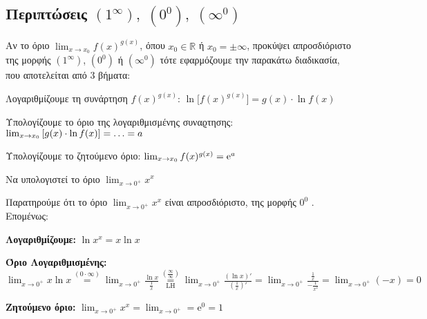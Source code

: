 \subsection*{Περιπτώσεις $ (1^{\infty}), \; (0^{0}), \; (\infty^{0}) $}


Αν το όριο $ \lim_{x \to x_{0}} f(x)^{g(x)} $, όπου $ x_{0} \in
\mathbb{R} $ ή $ x_{0}= \pm \infty $, προκύψει απροσδιόριστο της μορφής 
$ (1^{\infty}) $, $ (0^0) $ ή $ (\infty^{0}) $ 
τότε εφαρμόζουμε την παρακάτω διαδικασία, που αποτελείται από 3 βήματα:
\begin{myitemize}
  \item \textcolor{Col1}{Λογαριθμίζουμε τη συνάρτηση $ f(x)^{g(x)} $:} $ \ln{\bigl[f(x)^{g(x)}\bigr]} = g(x)\cdot \ln{f(x)} $
  \item \textcolor{Col1}{Υπολογίζουμε το όριο της λογαριθμισμένης συναϱτησης:} 
    $ \lim_{\smash{x \to x_{0}}} \left[g(x)\cdot \ln{f(x)}\right] = \ldots = a $
  \item \textcolor{Col1}{Υπολογίζουμε το ζητούμενο όριο:} 
    $ \lim_{x \to x_{0}} \smash{f(x)^{g(x)}} = \mathrm{e}^{a} $
\end{myitemize}


\begin{example}
  Να υπολογιστεί το όριο $ \lim_{x \to 0^{+}} x^{x} $
\end{example}
\begin{solution}
  Παρατηρούμε ότι το όριο $ \lim_{x \to 0^{+}} x^{x} $ είναι απροσδιόριστο, της μορφής 
  $ 0^{0} $ . Επομένως:
  \begin{myitemize}
    \item \textbf{Λογαριθμίζουμε:} $ \ln{x^{x}} = x \ln{x} $
    \item \textbf{Όριο Λογαριθμισμένης:} $ \lim_{x \to 0^{+}} x \ln{x} \overset{(0 \cdot
      \infty)}{=} \lim_{x \to 0^{+}} \frac{\ln{x}}{\frac{1}{x}}
      \overset{\left(\frac{\infty}{\infty}\right)}{\underset{\mathrm{LH}}{=}}  
      \lim_{x \to 0^{+}} \frac{(\ln{x} )'}{(\frac{1}{x} )'} = \lim_{x \to 0^{+}}
      \frac{\frac{1}{x}}{- \frac{1}{x^{2}}} = \lim_{x \to 0^{+}} (-x) = 0 $
    \item \textbf{Ζητούμενο όριο:} $ \lim_{x \to 0^{+}} x^{x} = \lim_{x \to 0^{+}} = 
      \mathrm{e}^{0} = 1 $ 
  \end{myitemize}
\end{solution}

